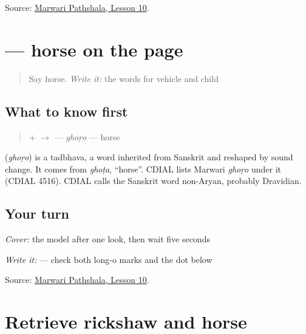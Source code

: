 \begin{tcolorbox}[breakable,colback=teal!4,colframe=teal!35!black,title={Before you move on}]
Source: \href{https://www.marwaripathshala.com/marwari-lesson-10-english}{Marwari Pathshala, Lesson 10}.
\end{tcolorbox}
\section[\texorpdfstring{\mw{घोड़ो} (ghoṛo)}{घोड़ो (ghoṛo)}]{ — horse on the page}

\label{lesson:MW-C17-ghodo}



\begin{quote}
Say horse. \emph{Write it:} the words for vehicle and child
\end{quote}

\subsection*{What to know first}
\begin{quote}
\textbf{} + \textbf{} $\to$ \textbf{} — \emph{ghoṛo} — horse
\end{quote}

\begin{cousinweb}
\textbf{} (\emph{ghoṛo}) is a tadbhava, a word inherited from Sanskrit and reshaped by sound change. It comes from \emph{ghoṭa}, \textquotedblleft{}horse\textquotedblright{}. CDIAL lists Marwari \emph{ghoṛo} under it (CDIAL 4516). CDIAL calls the Sanskrit word non-Aryan, probably Dravidian.
\end{cousinweb}

\subsection*{Your turn}
\emph{Cover:} the model after one look, then wait five seconds

\emph{Write it:} \textbf{} — check both long-o marks and the dot below \textbf{}

\begin{tcolorbox}[breakable,colback=teal!4,colframe=teal!35!black,title={Before you move on}]
Source: \href{https://www.marwaripathshala.com/marwari-lesson-10-english}{Marwari Pathshala, Lesson 10}.
\end{tcolorbox}
\section[Practice]{Retrieve rickshaw and horse}

